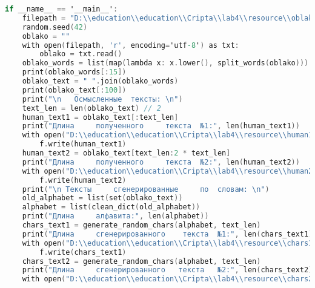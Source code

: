 \begin{lstlisting}[language=C]
if __name__ == '__main__':
    filepath = "D:\\education\\education\\Cripta\\lab4\\resource\\oblako.txt"
    random.seed(42)
    oblako = ""
    with open(filepath, 'r', encoding='utf-8') as txt:
        oblako = txt.read()
    oblako_words = list(map(lambda x: x.lower(), split_words(oblako)))
    print(oblako_words[:15])
    oblako_text = " ".join(oblako_words)
    print(oblako_text[:100])
    print("\n 	Осмысленные	 тексты: \n")
    text_len = len(oblako_text) // 2
    human_text1 = oblako_text[:text_len]
    print("Длина	 полученного	 текста	 №1:", len(human_text1))
    with open("D:\\education\\education\\Cripta\\lab4\\resource\\human1.txt", 'w') as f:
        f.write(human_text1)
    human_text2 = oblako_text[text_len:2 * text_len]
    print("Длина	 полученного	 текста	 №2:", len(human_text2))
    with open("D:\\education\\education\\Cripta\\lab4\\resource\\human2.txt", 'w') as f:
        f.write(human_text2)
    print("\n Тексты	 сгенерированные	 по	 словам: \n")
    old_alphabet = list(set(oblako_text))
    alphabet = list(clean_dict(old_alphabet))
    print("Длина	 алфавита:", len(alphabet))
    chars_text1 = generate_random_chars(alphabet, text_len)
    print("Длина	 сгенерированного	 текста	 №1:", len(chars_text1))
    with open("D:\\education\\education\\Cripta\\lab4\\resource\\chars1.txt", 'w') as f:
        f.write(chars_text1)
    chars_text2 = generate_random_chars(alphabet, text_len)
    print("Длина	 сгенерированного 	текста	 №2:", len(chars_text2))
    with open("D:\\education\\education\\Cripta\\lab4\\resource\\chars2.txt", 'w') as f:

\end{lstlisting}

